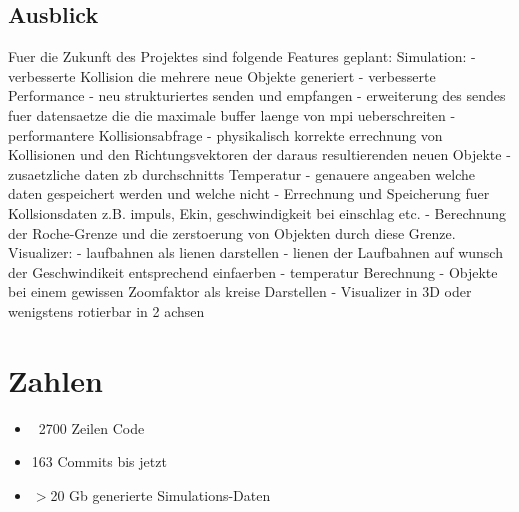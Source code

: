 \subsection{Ausblick}
Fuer die Zukunft des Projektes sind folgende Features geplant:
    Simulation:
        - verbesserte Kollision die mehrere neue Objekte generiert
        - verbesserte Performance
        - neu strukturiertes senden und empfangen
        - erweiterung des sendes fuer datensaetze die die maximale
          buffer laenge von mpi ueberschreiten
        - performantere Kollisionsabfrage
        - physikalisch korrekte errechnung von Kollisionen und den
          Richtungsvektoren der daraus resultierenden neuen Objekte
        - zusaetzliche daten zb durchschnitts Temperatur
        - genauere angeaben welche daten gespeichert werden und welche nicht
        - Errechnung und Speicherung fuer Kollsionsdaten z.B. impuls, Ekin,
          geschwindigkeit bei einschlag etc.
        - Berechnung der Roche-Grenze und die zerstoerung von Objekten 
          durch diese Grenze.
    Visualizer:
        - laufbahnen als lienen darstellen
        - lienen der Laufbahnen auf wunsch der Geschwindikeit entsprechend
          einfaerben
        - temperatur Berechnung
        - Objekte bei einem gewissen Zoomfaktor als kreise Darstellen
        - Visualizer in 3D oder wenigstens rotierbar in 2 achsen

\section{Zahlen}
\begin{itemize}
    \item ~2700 Zeilen Code
    \item 163 Commits bis jetzt
    \item $>$20 Gb generierte Simulations-Daten
\end{itemize}


